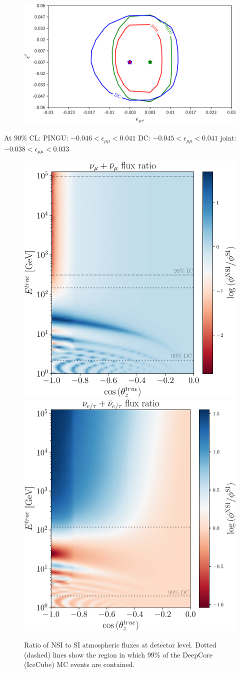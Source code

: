 \documentclass[draft=True]{revtex4-2}
\newcommand{\emm}{\ensuremath{\epsilon_{\mu\mu}}}
\begin{document}
 \begin{figure}[!tb]
    \begin{center}
       \includegraphics[width=0.4\linewidth]{figures/emm_emp_contour.pdf}
    \end{center}
    \caption{}\label{fig:emm_emp_contour}
 \end{figure}
At $90\%$ CL:
PINGU: $-0.046 < \emm < 0.041$
DC: $-0.045 < \emm < 0.041$
joint: $-0.038 < \emm < 0.033$
\begin{figure}[!tb]
    \begin{center}
       \includegraphics[width=0.4\linewidth]{figures/track_flux_ratio.pdf}
       \includegraphics[width=0.4\linewidth]{figures/cascade_flux_ratio.pdf}
    \end{center}
    \caption{Ratio of NSI to SI atmospheric fluxes at detector level. Dotted (dashed) lines show the region in which 99\% of the 
    DeepCore (IceCube) MC events are contained.}\label{fig:flux_ratio}
 \end{figure}
\end{document}
